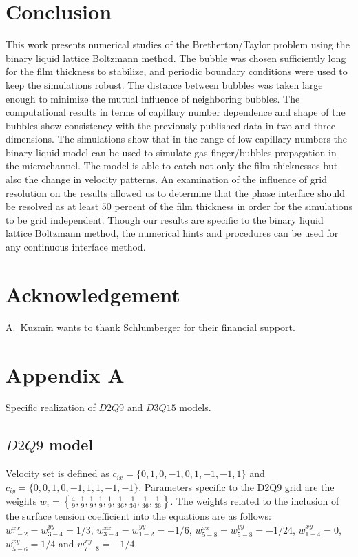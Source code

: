 \documentclass{CFD2011}
\begin{document}
\section{Conclusion}
This work presents numerical studies of the
Bretherton/Taylor problem using the binary liquid lattice Boltzmann method. The bubble was chosen
sufficiently long for the film
thickness to
stabilize, and periodic boundary conditions were used to keep the simulations robust. The
distance between bubbles was taken large enough to minimize
the mutual influence of neighboring bubbles. The computational
results in terms of capillary number dependence and shape of the bubbles show consistency with the
previously published data in two and three dimensions. The simulations show that in the range of low
capillary numbers the binary liquid model can be used to
simulate gas finger/bubbles propagation in the microchannel. The model is able to catch not only
the film thicknesses but also the change in velocity patterns. 
 An examination of the influence of grid resolution on the
results allowed
us to determine that the phase interface should be resolved as at least $50$ percent of the film
thickness
in order for the simulations to be grid independent. Though our results are specific to the binary
liquid lattice
Boltzmann method, the numerical hints and procedures can be used for any
continuous interface method. 

\section{Acknowledgement}
A.~Kuzmin wants to thank Schlumberger for their financial support.


%   

\section{Appendix A}
\label{app:models}
Specific realization of $D2Q9$ and $D3Q15$ models.
\subsection{$D2Q9$ model}
Velocity set is defined as $c_{ix}=\{0,1,0,-1,0,1,-1,-1,1\}$ and $c_{iy}=\{0,0,1,0,-1,1,1,-1,-1\}$.
Parameters specific to the D2Q9 grid are the weights
$w_i=\left\{\frac{4}{9},\frac{1}{9},\frac{1}{9},\frac{1}{9},\frac{1}{9},
\frac{1}{36},\frac{1}{36},\frac{1}{36},\frac{1}{36}\right\}$.  The weights related to the
inclusion of the surface tension coefficient into the equations are as follows:
$w^{xx}_{1-2}=w^{yy}_{3-4}=1/3$, $w^{xx}_{3-4}=w^{yy}_{1-2}=-1/6$,
$w^{xx}_{5-8}=w^{yy}_{5-8}=-1/24$, $w^{xy}_{1-4}=0$, $w^{xy}_{5-6}=1/4$ and
$w^{xy}_{7-8}=-1/4$.
\end{document}
